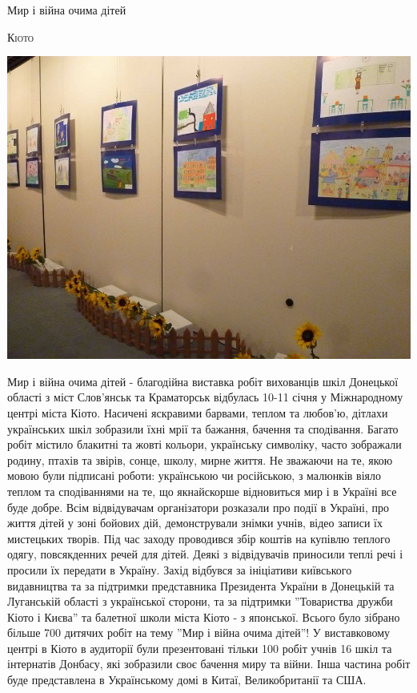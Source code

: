 \documentclass[10pt,a4paper]{article}
\newcommand{\NewsItem}[1]{%
		\usefont{T2A}{iwona}{m}{n} 
		\large #1 \vspace{4pt}
		\par \normalsize \normalfont}
\newcommand{\NewsAuthor}[1]{%
			\hfill \textsc{#1} \vspace{4pt}
			\par \normalfont}
\begin{document}
\begin{multicols}{3}
\vspace{1cm}
\NewsItem{Мир і війна очима дітей}
\NewsAuthor{Кіото}
		\begin{center}
			\includegraphics[width=0.8\linewidth]{images/war-and-peace}
		\end{center}
Мир і війна очима дітей - благодійна виставка робіт вихованців шкіл Донецької області з міст Слов'янськ та Краматорськ відбулась 10-11 січня у Міжнародному центрі міста Кіото.
Насичені яскравими барвами, теплом та любов'ю, дітлахи українських шкіл зобразили їхні мрії та бажання, бачення та сподівання. Багато робіт містило блакитні та жовті кольори, українську символіку, часто зображали родину, птахів та звірів, сонце, школу, мирне життя. Не зважаючи на те, якою мовою були підписані роботи: українською чи російською, з малюнків віяло теплом та сподіваннями на те, що якнайскорше відновиться мир і в Україні все буде добре.
Всім відвідувачам організатори розказали про події в Україні, про життя дітей у зоні бойових дій, демонстрували знімки учнів, відео записи їх мистецьких творів. 
Під час заходу проводився збір коштів на купівлю теплого одягу, повсякденних речей для дітей. Деякі з відвідувачів приносили теплі речі і просили їх передати в Україну.
Захід відбувся за ініціативи київського видавництва та за підтримки представника Президента України в Донецькій та Луганській області з української сторони, та за підтримки ''Товариства дружби Кіото і Києва'' та балетної школи міста Кіото - з японської. Всього було зібрано більше 700 дитячих робіт на тему ''Мир і війна очима дітей''! У виставковому центрі в Кіото в аудиторії були презентовані тільки 100 робіт учнів 16 шкіл та інтернатів Донбасу, які зобразили своє бачення миру та війни. Інша частина робіт буде представлена в Українському домі в Китаї, Великобританії та США.

\end{multicols}
\end{document}
